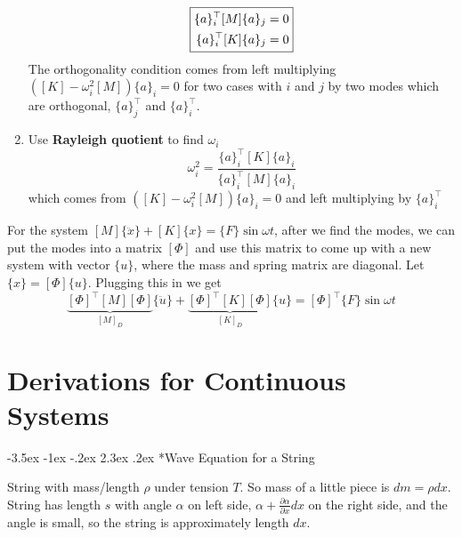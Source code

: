 \documentclass[letterpaper,twocolumn,notitlepage]{article}
\makeatletter
\renewcommand\subsection{\@startsection{section}{1}{\z@}%
 {-3.5ex \@plus-1ex \@minus-.2ex}%
 {2.3ex \@plus.2ex}%
 {\fontsize{8pt}{8pt}\selectfont\sffamily}}
\makeatother
\begin{document}
\begin{enumerate}
\begin{equation*}
      \boxed{%
      \begin{split}
        \{a\}_{i}^{\top}[M]\{a\}_{j}&=0 \\
        \{a\}_{i}^{\top}[K]\{a\}_{j}&=0 \\
      \end{split}}
    \end{equation*}
    The orthogonality condition comes from left multiplying $\left([K]-\omega_{i}^{2}[M]\right)\{a\}_{i}=0$ for two cases with $i$ and $j$ by two modes which are orthogonal, $\{a\}_{j}^{\top}$ and $\{a\}_{i}^{\top}$.
    \item{Use \textbf{Rayleigh quotient} to find $\omega_{i}$}
    \begin{equation*}
      \boxed{\omega_{i}^{2}=\frac{\{a\}_{i}^{\top}[K]\{a\}_{i}}{\{a\}_{i}^{\top}[M]\{a\}_{i}}}
    \end{equation*}
    which comes from $\left([K]-\omega_{i}^{2}[M]\right)\{a\}_{i}=0$ and left multiplying by $\{a\}_{i}^{\top}$
  \end{enumerate}
  For the system $[M]\{\ddot{x}\}+[K]\{x\}=\{F\}\sin\omega t$, after we find the modes, we can put the modes into a matrix $[\Phi]$ and use this matrix to come up with a new system with vector $\{u\}$, where the mass and spring matrix are diagonal.
  Let $\{x\}=[\Phi]\{u\}$.
  Plugging this in we get
  \begin{equation*}
    \underbrace{[\Phi]^{\top}[M][\Phi]}_{[M]_{D}}\{\ddot{u}\}+\underbrace{[\Phi]^{\top}[K][\Phi]}_{[K]_{D}}\{u\}=[\Phi]^{\top}\{F\}\sin\omega t
  \end{equation*}

  \section*{Derivations for Continuous Systems}

  \subsection*{Wave Equation for a String}

  String with mass/length $\rho$ under tension $T$.
  So mass of a little piece is $dm=\rho dx$.
  String has length $s$ with angle $\alpha$ on left side, $\alpha+\frac{\partial\alpha}{\partial x}dx$ on the right side, and the angle is small, so the string is approximately length $dx$.
\end{document}
